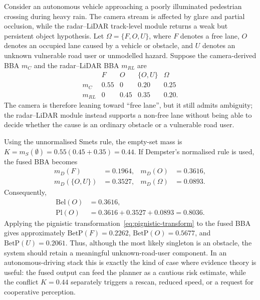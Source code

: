 \begin{example}
Consider an autonomous vehicle approaching a poorly illuminated pedestrian crossing during heavy rain. The camera stream is affected by glare and partial occlusion, while the radar--LiDAR track-level module returns a weak but persistent object hypothesis. Let
\(\Omega=\{F,O,U\}\), where \(F\) denotes a free lane, \(O\) denotes an occupied lane caused by a vehicle or obstacle, and \(U\) denotes an unknown vulnerable road user or unmodelled hazard. Suppose the camera-derived BBA \(m_C\) and the radar--LiDAR BBA \(m_{RL}\) are
\begin{equation}
\begin{array}{c|cccc}
 & F & O & \{O,U\} & \Omega \\
\hline
m_C & 0.55 & 0 & 0.20 & 0.25 \\
m_{RL} & 0 & 0.45 & 0.35 & 0.20 .
\end{array}
\label{eq:evidence-example-bbas}
\end{equation}
The camera is therefore leaning toward ``free lane'', but it still admits ambiguity; the radar--LiDAR module instead supports a non-free lane without being able to decide whether the cause is an ordinary obstacle or a vulnerable road user.

Using the unnormalised Smets rule, the empty-set mass is
\(K=m_S(\emptyset)=0.55(0.45+0.35)=0.44\). If Dempster's normalised rule is used, the fused BBA becomes
\begin{equation}
\begin{aligned}
m_D(F)&=0.1964, &
m_D(O)&=0.3616,\\
m_D(\{O,U\})&=0.3527, &
m_D(\Omega)&=0.0893 .
\end{aligned}
\end{equation}
Consequently,
\begin{equation}
\begin{aligned}
\mathrm{Bel}(O)&=0.3616,\\
\mathrm{Pl}(O)&=0.3616+0.3527+0.0893=0.8036 .
\end{aligned}
\end{equation}
Applying the pignistic transformation~\eqref{eq:pignistic-transform} to the fused BBA gives approximately \(\mathrm{BetP}(F)=0.2262\), \(\mathrm{BetP}(O)=0.5677\), and \(\mathrm{BetP}(U)=0.2061\). Thus, although the most likely singleton is an obstacle, the system should retain a meaningful unknown-road-user component. In an autonomous-driving stack this is exactly the kind of case where evidence theory is useful: the fused output can feed the planner as a cautious risk estimate, while the conflict \(K=0.44\) separately triggers a rescan, reduced speed, or a request for cooperative perception. 
\end{example}
